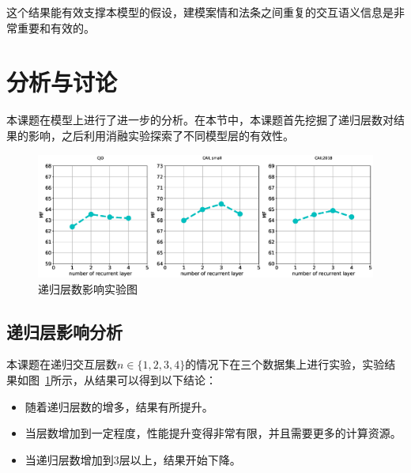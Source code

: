 这个结果能有效支撑本模型的假设，建模案情和法条之间重复的交互语义信息是非常重要和有效的。

\section{分析与讨论}
\label{sec:ran_analysis}
本课题在模型上进行了进一步的分析。在本节中，本课题首先挖掘了递归层数对结果的影响，之后利用消融实验探索了不同模型层的有效性。
\begin{figure}[hbtp]
    \centering
    \includegraphics[scale=0.39, clip=true]{./sources/3_recurrent_layers2.eps}
    \vspace{-10pt}
    \caption{\label{fig:n_layers} 递归层数影响实验图}
    \vspace{-5pt}
\end{figure}

\subsection{递归层影响分析}
本课题在递归交互层数$n \in \{1,2,3,4\}$的情况下在三个数据集上进行实验，实验结果如图~\ref{fig:n_layers}所示，从结果可以得到以下结论：
\begin{itemize}
    \item 随着递归层数的增多，结果有所提升。
    \item 当层数增加到一定程度，性能提升变得非常有限，并且需要更多的计算资源。
    \item 当递归层数增加到3层以上，结果开始下降。
\end{itemize}



